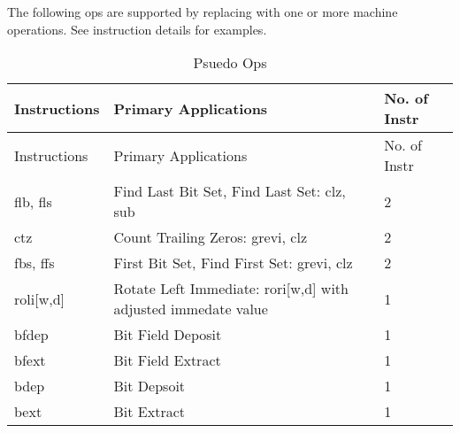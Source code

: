 The following ops are supported by replacing with one or more machine
operations. See instruction details for examples.

\begin{longtable}[c]{@{}lll@{}}
\caption{Psuedo Ops}\tabularnewline
\toprule
Instructions & Primary Applications & No. of Instr\tabularnewline
\midrule
\endfirsthead
\toprule
Instructions & Primary Applications & No. of Instr\tabularnewline
\midrule
\endhead
flb, fls & Find Last Bit Set, Find Last Set: clz, sub & 2\tabularnewline
ctz & Count Trailing Zeros: grevi, clz & 2\tabularnewline
fbs, ffs & First Bit Set, Find First Set: grevi, clz & 2\tabularnewline
roli{[}w,d{]} & Rotate Left Immediate: rori{[}w,d{]} with adjusted
immedate value & 1\tabularnewline
bfdep & Bit Field Deposit & 1\tabularnewline
bfext & Bit Field Extract & 1\tabularnewline
bdep & Bit Depsoit & 1\tabularnewline
bext & Bit Extract & 1\tabularnewline
\bottomrule
\end{longtable}
